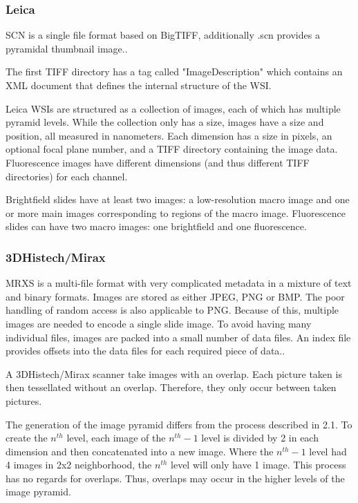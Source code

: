 \subsubsection{Leica}
SCN is a single file format based on BigTIFF, additionally .scn provides a pyramidal thumbnail image.\cite{Goode13}.

The first TIFF directory has a tag called "ImageDescription" which contains an XML document that defines the internal structure of the WSI\cite{web:openslide}.

Leica WSIs are structured as a collection of images, each of which has multiple pyramid levels. While the collection only has a size, images have a size and position, all measured in nanometers. Each dimension has a size in pixels, an optional focal plane number, and a TIFF directory containing the image data. Fluorescence images have different dimensions (and thus different TIFF directories) for each channel\cite{web:openslide}.

Brightfield slides have at least two images: a low-resolution macro image and one or more main images corresponding to regions of the macro image. Fluorescence slides can have two macro images: one brightfield and one fluorescence\cite{web:openslide}.


\subsubsection{3DHistech/Mirax}
MRXS is a multi-file format with very complicated metadata in a mixture of text and binary formats. Images are stored as either JPEG, PNG or BMP\cite{Goode13}. The poor handling of random access is also applicable to PNG. Because of this, multiple images are needed to encode a single slide image. To avoid having many individual files, images are packed into a small number of data files. An index file provides offsets into the data files for each required piece of data.\cite{web:openslide}. 

A 3DHistech/Mirax scanner take images with an overlap. Each picture taken is then tessellated without an overlap. Therefore, they only occur between taken pictures\cite{web:openslide}.

The generation of the image pyramid differs from the process described in 2.1. To create the $n^{th}$ level, each image of the $n^{th}-1$ level is divided by 2 in each dimension and then concatenated into a new image. Where the $n^{th}-1$ level had 4 images in 2x2 neighborhood, the $n^{th}$ level will only have 1 image. This process has no regards for overlaps. Thus, overlaps may occur in the higher levels of the image pyramid\cite{web:openslide}.


